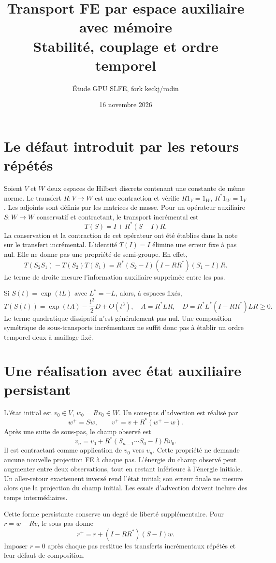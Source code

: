 \documentclass[11pt,a4paper]{article}
\title{Transport FE par espace auxiliaire avec mémoire\\
Stabilité, couplage et ordre temporel}
\author{Étude GPU SLFE, fork keckj/rodin}
\date{16 novembre 2026}
\newcommand{\id}{I}
\begin{document}
\maketitle

\section{Le défaut introduit par les retours répétés}
Soient $V$ et $W$ deux espaces de Hilbert discrets contenant une constante
de même norme. Le transfert $R:V\to W$ est une contraction et vérifie
$R1_V=1_W$, $R^*1_W=1_V$. Les adjoints sont définis par les matrices de masse.
Pour un opérateur auxiliaire $S:W\to W$ conservatif et contractant,
le transport incrémental est
\[
 T(S)=\id+R^*(S-\id)R .
\]
La conservation et la contraction de cet opérateur ont été établies dans
la note sur le transfert incrémental.
L'identité $T(\id)=\id$ élimine une erreur fixe à pas nul. Elle ne donne
pas une propriété de semi-groupe. En effet,
\[
 T(S_2S_1)-T(S_2)T(S_1)
 =R^*(S_2-\id)(\id-RR^*)(S_1-\id)R .
\]
Le terme de droite mesure l'information auxiliaire supprimée entre les pas.

Si $S(t)=\exp(tL)$ avec $L^*=-L$, alors, à espaces fixés,
\[
 T(S(t))=\exp(tA)-\frac{t^2}{2}D+O(t^3),\quad
 A=R^*LR,\quad
 D=R^*L^*(\id-RR^*)LR\geq0 .
\]
Le terme quadratique dissipatif n'est généralement pas nul. Une composition
symétrique de sous-transports incrémentaux ne suffit donc pas à établir
un ordre temporel deux à maillage fixé.

\section{Une réalisation avec état auxiliaire persistant}
L'état initial est $v_0\in V$, $w_0=Rv_0\in W$. Un sous-pas d'advection
est réalisé par
\[
 w^+=Sw,\qquad v^+=v+R^*(w^+-w).
\]
Après une suite de sous-pas, le champ observé est
\[
 v_n=v_0+R^*(S_{n-1}\cdots S_0-\id)Rv_0 .
\]
Il est contractant comme application de $v_0$ vers $v_n$. Cette propriété
ne demande aucune nouvelle projection FE à chaque pas. L'énergie du champ
observé peut augmenter entre deux observations, tout en restant inférieure
à l'énergie initiale. Un aller-retour exactement inversé rend l'état initial;
son erreur finale ne mesure alors que la projection du champ initial.
Les essais d'advection doivent inclure des temps intermédiaires.

Cette forme persistante conserve un degré de liberté supplémentaire.
Pour $r=w-Rv$, le sous-pas donne
\[
 r^+=r+(\id-RR^*)(S-\id)w .
\]
Imposer $r=0$ après chaque pas restitue les transferts incrémentaux répétés
et leur défaut de composition.
\end{document}
